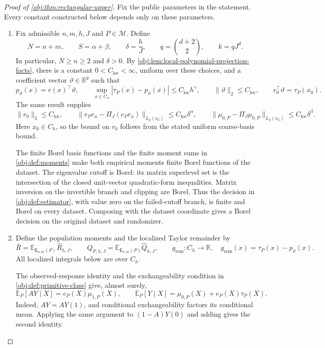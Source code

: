 \begin{proof}[Proof of \cref{obj:thm:rectangular-upper}]
Fix the public parameters in the statement. Every constant constructed below depends only on these parameters.

\begin{enumerate}
\item Fix admissible \(n,m,h,J\) and \(P\in\mathcal M\). Define
\[
N=n+m,\qquad S=\alpha+\beta,\qquad
\delta=\frac hJ,\qquad
q=\binom{d+2}{2},\qquad k=qJ^d.
\]
In particular, \(N\ge n\ge2\) and \(\delta>0\).
By \cref{obj:lem:local-polynomial-projection-facts}, there is a constant
\(0<C_{\mathrm{loc}}<\infty\), uniform over these choices, and a coefficient vector
\(\vartheta\in\mathbb R^q\) such that
\[
p_\vartheta(x)=r(x)^\top\vartheta,\qquad
\sup_{x\in C_h}|\tau_P(x)-p_\vartheta(x)|
 \le C_{\mathrm{loc}}h^\gamma,\qquad
\|\vartheta\|_2\le C_{\mathrm{loc}},
\qquad
r_0^\top\vartheta=\tau_P(x_0).
\]
The same result supplies
\[
\|r_0\|_2\le C_{\mathrm{loc}},\qquad
\|e_Pr_u-\Pi_J(e_Pr_u)\|_{L_2(\nu_h)}
 \le C_{\mathrm{loc}}\delta^\alpha,\qquad
\|\mu_{0,P}-\Pi_J\mu_{0,P}\|_{L_2(\nu_h)}
 \le C_{\mathrm{loc}}\delta^\beta.
\]
Here \(x_0\in C_h\), so the bound on \(r_0\) follows from the stated uniform coarse-basis bound.

The finite Borel basis functions and the finite moment sums in
\cref{obj:def:moments} make both empirical moments finite Borel functions of the dataset.
The eigenvalue cutoff is Borel: its matrix superlevel set is the intersection of the closed unit-vector quadratic-form inequalities. Matrix inversion on the invertible branch and clipping are Borel. Thus the decision in
\cref{obj:def:estimator}, with value zero on the failed-cutoff branch, is finite and Borel on every dataset. Composing with the dataset coordinate gives a Borel decision on the original dataset and randomizer.%

\item Define the population moments and the localized Taylor remainder by
\[
\bar R=\mathbb E_{\mathsf E_{n,m}(P)}\widehat R_{h,J},
\qquad
Q_{P,h,J}=\mathbb E_{\mathsf E_{n,m}(P)}\widehat Q_{h,J},
\qquad
g_{\mathrm{rem}}:C_h\longrightarrow\mathbb R,\quad
g_{\mathrm{rem}}(x)=\tau_P(x)-p_\vartheta(x).
\]
All localized integrals below are over \(C_h\).

The observed-response identity and the exchangeability condition in
\cref{obj:def:primitive-class} give, almost surely,
\[
\mathbb E_P[AY\mid X]=e_P(X)\mu_{1,P}(X),
\qquad
\mathbb E_P[Y\mid X]
 =\mu_{0,P}(X)+e_P(X)\tau_P(X).
\]
Indeed, \(AY=AY(1)\), and conditional exchangeability factors its conditional mean. Applying the same argument to \((1-A)Y(0)\) and adding gives the second identity.


\end{enumerate}
\end{proof}

